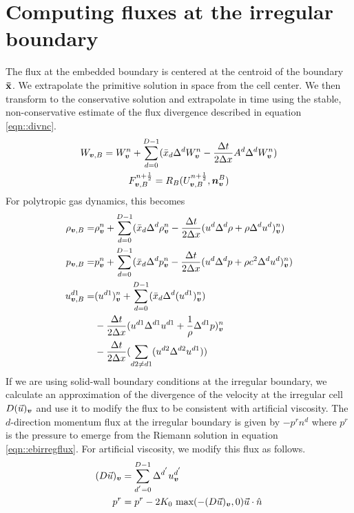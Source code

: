 \section{Computing fluxes at the irregular boundary}

The flux at the embedded boundary is centered at the centroid of 
the boundary ${\bf \bar x}$.    We extrapolate the primitive solution
in space from the cell center.  We then transform to the conservative
solution and extrapolate in time using the stable, non-conservative
estimate of the flux divergence described in equation \ref{eqn::divnc}.
\begin{gather}
W_{{\boldsymbol{v}}, B} = W^n_{\boldsymbol{v}} + \sum^{D-1}_{d=0}(\bar x_d \Delta^d
W^n_{\boldsymbol{v}}   - \frac{\Delta t}{2 \Delta x} A^d \Delta^d W^n_{\boldsymbol{v}} )\\
F^{n + \frac{1}{2}}_{{\boldsymbol{v}}, B} = R_B(U^{n + \frac{1}{2}}_{{\boldsymbol{v}}, B}, {\boldsymbol{n}}^B_{\boldsymbol{v}})
\label{eqn::ebirregflux}
\end{gather}
For polytropic gas dynamics, this becomes
\begin{align}
\begin{split}
\rho_{{\boldsymbol{v}}, B} =& \rho^n_{\boldsymbol{v}} + \sum^{D-1}_{d=0}(\bar x_d \Delta^d \rho^n_{\boldsymbol{v}}
   - \frac{\Delta t}{2 \Delta x}(u^d \Delta^d \rho  + \rho \Delta^d
   u^d)^n_{\boldsymbol{v}}) \\
p_{{\boldsymbol{v}}, B} =& p^n_{\boldsymbol{v}} + \sum^{D-1}_{d=0}(\bar x_d \Delta^d p^n_{\boldsymbol{v}}
  - \frac{\Delta t}{2 \Delta x}(u^d \Delta^d p  + \rho c^2 \Delta^d
  u^d)^n_{\boldsymbol{v}})\\
u^{d1}_{{\boldsymbol{v}}, B} =& (u^{d1})^n_{\boldsymbol{v}} + \sum^{D-1}_{d=0}(\bar x_d
\Delta^d (u^{d1})^n_{\boldsymbol{v}}) \\
&- \frac{\Delta t}{2 \Delta x}(u^{d1} \Delta^{d1} u^{d1}  +\frac{1}{\rho} \Delta^{d1} p)^n_{\boldsymbol{v}}  \\
&- \frac{\Delta t}{2 \Delta x}(\sum_{d2 \ne d1} (u^{d2} \Delta^{d2} u^{d1}))
\label{eqn::ebirregflux}
\end{split}
\end{align}
If we are using solid-wall boundary conditions at the irregular boundary,
we calculate an approximation of the divergence of the velocity at the
irregular cell $D(\vec u)_{\boldsymbol{v}}$ and use it to modify the flux to 
be consistent with artificial viscosity.  The $d$-direction
momentum flux at the irregular boundary is given by $-p^r n^d$ where
$p^r$ is the pressure to emerge from the Riemann solution in equation 
\ref{eqn::ebirregflux}.  For artificial viscosity, we modify this flux
as follows.
\begin{align*}
(D \vec u)_{\boldsymbol{v}} &= 
\sum\limits^{D-1}_{{d^{'}}=0} \Delta^{d^{'}} u^{d^{'}}_{{\boldsymbol{v}}} \\
p^r & = p^r - 2K_0~\text{max}(-(D\vec u)_{\boldsymbol{v}}, 0) \vec u \cdot \hat n 
\end{align*}

